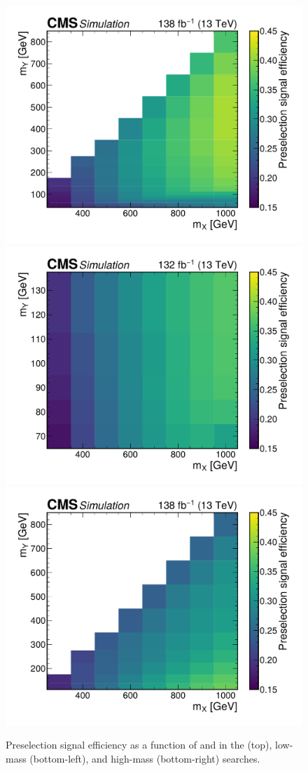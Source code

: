 \begin{figure}
  \centering
  \includegraphics[width=.49\linewidth]{Figures/Dihiggs/trigger/Y_tautau/sig_eff_heatmap_thesis.pdf} \\
  \includegraphics[width=.49\linewidth]{Figures/Dihiggs/trigger/Y_gg_Low_Mass/sig_eff_heatmap_thesis.pdf}
  \includegraphics[width=.49\linewidth]{Figures/Dihiggs/trigger/Y_gg_High_Mass/sig_eff_heatmap_thesis.pdf}
  \caption[Preselection Efficiency as a Function of \mX and \mY in the \XYH Searches]{Preselection signal efficiency as a function of \mX and \mY in the \XYttHgg (top), low-mass \XYggHtt (bottom-left), and high-mass \XYggHtt (bottom-right) searches.}\label{fig:presel_eff_xyh}
\end{figure}
